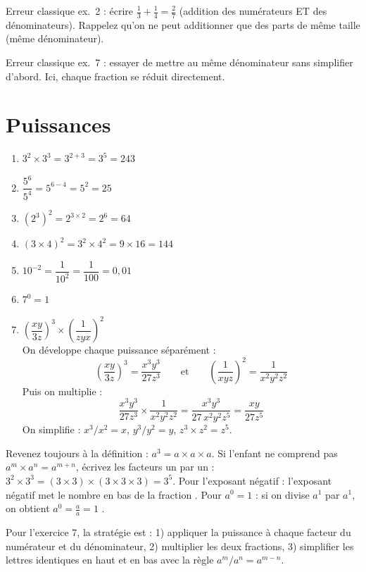 \documentclass[11pt,a4paper]{article}
\newcommand{\corrbox}[1]{
\begin{tcolorbox}[colback=correctgreen!8!white,colframe=correctgreen!60!black]
#1
\end{tcolorbox}
}
\newcommand{\tipbox}[1]{
\begin{tcolorbox}[colback=tipblue!8!white,colframe=tipblue!60!black,title=\textbf{Comment expliquer}]
#1
\end{tcolorbox}
}
\newcommand{\warnbox}[1]{
\begin{tcolorbox}[colback=warnred!8!white,colframe=warnred!60!black,title=\textbf{Erreurs fr\'equentes}]
#1
\end{tcolorbox}
}
\begin{document}
\warnbox{
Erreur classique ex.~2 : \'ecrire $\frac{1}{3} + \frac{1}{4} = \frac{2}{7}$ (addition des num\'erateurs ET des d\'enominateurs). Rappelez qu'on ne peut additionner que des parts de m\^eme taille (m\^eme d\'enominateur).

\vspace{0.2cm}
Erreur classique ex.~7 : essayer de mettre au m\^eme d\'enominateur sans simplifier d'abord. Ici, chaque fraction se r\'eduit directement.
}

\section{Puissances}

\corrbox{
\begin{enumerate}
\item $3^{2} \times 3^{3} = 3^{2+3} = 3^{5} = 243$
\item $\dfrac{5^{6}}{5^{4}} = 5^{6-4} = 5^{2} = 25$
\item $(2^{3})^{2} = 2^{3 \times 2} = 2^{6} = 64$
\item $(3 \times 4)^{2} = 3^{2} \times 4^{2} = 9 \times 16 = 144$
\item $10^{-2} = \dfrac{1}{10^{2}} = \dfrac{1}{100} = 0{,}01$
\item $7^{0} = 1$
\item $\left(\dfrac{xy}{3z}\right)^{3} \times \left(\dfrac{1}{zyx}\right)^{2}$\\[0.3cm]
On d\'eveloppe chaque puissance s\'epar\'ement :
\[
\left(\dfrac{xy}{3z}\right)^{3} = \dfrac{x^{3}y^{3}}{27z^{3}}
\qquad\text{et}\qquad
\left(\dfrac{1}{xyz}\right)^{2} = \dfrac{1}{x^{2}y^{2}z^{2}}
\]
Puis on multiplie :
\[
\dfrac{x^{3}y^{3}}{27z^{3}} \times \dfrac{1}{x^{2}y^{2}z^{2}} = \dfrac{x^{3}y^{3}}{27\,x^{2}y^{2}z^{5}} = \dfrac{xy}{27z^{5}}
\]
On simplifie : $x^{3}/x^{2} = x$, \; $y^{3}/y^{2} = y$, \; $z^{3} \times z^{2} = z^{5}$.
\end{enumerate}
}

\tipbox{
Revenez toujours \`a la d\'efinition : $a^{3} = a \times a \times a$. Si l'enfant ne comprend pas $a^{m} \times a^{n} = a^{m+n}$, \'ecrivez les facteurs un par un : $3^{2} \times 3^{3} = (3 \times 3) \times (3 \times 3 \times 3) = 3^{5}$. Pour l'exposant n\'egatif : \guillemotleft{} l'exposant n\'egatif met le nombre en bas de la fraction \guillemotright{}. Pour $a^{0} = 1$ : \guillemotleft{} si on divise $a^{1}$ par $a^{1}$, on obtient $a^{0} = \frac{a}{a} = 1$ \guillemotright{}.

\vspace{0.2cm}
Pour l'exercice 7, la strat\'egie est : 1) appliquer la puissance \`a chaque facteur du num\'erateur et du d\'enominateur, 2) multiplier les deux fractions, 3) simplifier les lettres identiques en haut et en bas avec la r\`egle $a^{m}/a^{n} = a^{m-n}$.
}
\end{document}
